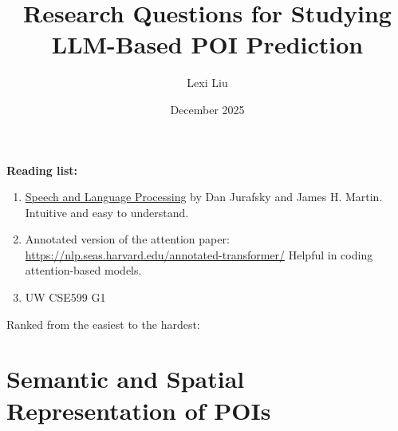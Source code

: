\documentclass{article}
\title{Research Questions for Studying LLM-Based POI Prediction}
\author{Lexi Liu}
\date{December 2025}
\begin{document}
\textbf{Reading list:}
\begin{enumerate}
    \item \href{https://web.stanford.edu/~jurafsky/slp3/}{Speech and Language Processing} by Dan Jurafsky and James H. Martin.\\
    Intuitive and easy to understand.
    
    \item Annotated version of the attention paper:  \href{https://nlp.seas.harvard.edu/annotated-transformer/}{https://nlp.seas.harvard.edu/annotated-transformer/}
    Helpful in coding attention-based models.

    \item UW CSE599 G1 \href{https://courses.cs.washington.edu/courses/cse493g1/24au/}{}
\end{enumerate}


Ranked from the easiest to the hardest:
\section{Semantic and Spatial Representation of POIs}
\end{document}
